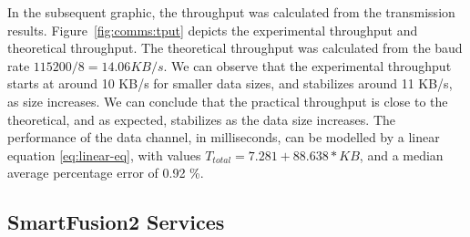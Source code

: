 In the subsequent graphic, the throughput was calculated from the transmission results.
Figure~\ref{fig:comms:tput} depicts the experimental throughput and theoretical throughput. The theoretical throughput was calculated from the baud rate \(115200/8 = 14.06 KB/s\).
We can observe that the experimental throughput starts at around 10 KB/s for smaller data sizes, and stabilizes around 11 KB/s, as size increases.
We can conclude that the practical throughput is close to the theoretical, and as expected, stabilizes as the data size increases.
The performance of the data channel, in milliseconds, can be modelled by a linear equation \ref{eq:linear-eq}, with values \(T_{total} = 7.281 + 88.638 * KB\), and a median average percentage error of 0.92 \%.

\subsection{SmartFusion2 Services}\label{chap:evaluation:board}


